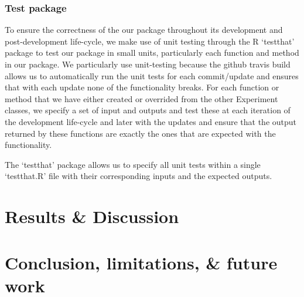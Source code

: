 \documentclass[
]{article}
\begin{document}
\hypertarget{test-package}{%
\subsubsection{Test package}\label{test-package}}

To ensure the correctness of the our package throughout its development
and post-development life-cycle, we make use of unit testing through the
R `testthat' package to test our package in small units, particularly
each function and method in our package. We particularly use
unit-testing because the github travis build allows us to automatically
run the unit tests for each commit/update and ensures that with each
update none of the functionality breaks. For each function or method
that we have either created or overrided from the other Experiment
classes, we specify a set of input and outputs and test these at each
iteration of the development life-cycle and later with the updates and
ensure that the output returned by these functions are exactly the ones
that are expected with the functionality.

The `testthat' package allows us to specify all unit tests within a
single `testthat.R' file with their corresponding inputs and the
expected outputs.

\hypertarget{results-discussion}{%
\section{Results \& Discussion}\label{results-discussion}}

\hypertarget{conclusion-limitations-future-work}{%
\section{Conclusion, limitations, \& future
work}\label{conclusion-limitations-future-work}}
\end{document}
